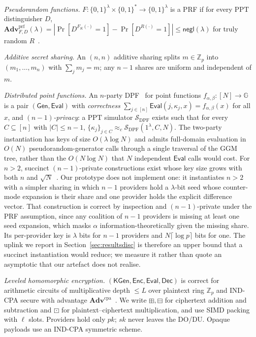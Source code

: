 \documentclass[journal]{IEEEtran}
\newcommand{\negl}{\mathsf{negl}}
\newcommand{\PPT}{\mathrm{PPT}}
\newcommand{\Sim}{\mathcal{S}}
\newcommand{\cind}{\approx_c}
\newcommand{\Gen}{\mathsf{Gen}}
\newcommand{\Eval}{\mathsf{Eval}}
\newcommand{\Dec}{\mathsf{Dec}}
\newcommand{\Enc}{\mathsf{Enc}}
\newcommand{\advPRF}{\mathbf{Adv}^{\mathrm{prf}}}
\newcommand{\advCPA}{\mathbf{Adv}^{\mathrm{cpa}}}
\newcommand{\bplus}{\boxplus}
\newcommand{\bminus}{\boxminus}
\newcommand{\bdot}{\boxdot}
\begin{document}
\emph{Pseudorandom functions.} $F:\{0,1\}^\lambda\times\{0,1\}^*\!\to\!\{0,1\}^\lambda$ is a PRF if for every $\PPT$ distinguisher $D$, $\advPRF_{F,D}(\lambda)=|\Pr[D^{F_K(\cdot)}=1]-\Pr[D^{R(\cdot)}=1]|\le\negl(\lambda)$ for truly random $R$~\cite{goldreich2019construct}.

\emph{Additive secret sharing.} An $(n,n)$ additive sharing splits $m\in\mathbb{Z}_p$ into $(m_1,\dots,m_n)$ with $\sum_j m_j=m$; any $n-1$ shares are uniform and independent of $m$.

\emph{Distributed point functions.} An $n$-party DPF~\cite{gilboa2014distributed,boyle2015function,boyle2016function} for point functions $f_{\alpha,\beta}:[N]\!\to\!\mathbb{G}$ is a pair $(\Gen,\Eval)$ with \emph{correctness} $\sum_{j\in[n]}\Eval(j,\kappa_j,x)=f_{\alpha,\beta}(x)$ for all $x$, and \emph{$(n{-}1)$-privacy}: a $\PPT$ simulator $\Sim_{\mathrm{DPF}}$ exists such that for every $C\subseteq[n]$ with $|C|\le n{-}1$, $\{\kappa_j\}_{j\in C}\cind\Sim_{\mathrm{DPF}}(1^\lambda,C,N)$. The two-party instantiation has keys of size $O(\lambda\log N)$ and admits full-domain evaluation in $O(N)$ pseudorandom-generator calls through a single traversal of the GGM tree, rather than the $O(N\log N)$ that $N$ independent $\Eval$ calls would cost. For $n>2$, succinct $(n{-}1)$-private constructions exist whose key size grows with both $n$ and $\sqrt{N}$~\cite{boyle2015function}. Our prototype does not implement one: it instantiates $n>2$ with a simpler sharing in which $n-1$ providers hold a $\lambda$-bit seed whose counter-mode expansion is their share and one provider holds the explicit difference vector. That construction is correct by inspection and $(n{-}1)$-private under the PRF assumption, since any coalition of $n-1$ providers is missing at least one seed expansion, which masks $\alpha$ information-theoretically given the missing share. Its per-provider key is $\lambda$ bits for $n-1$ providers and $N\lceil\log p\rceil$ bits for one. The uplink we report in Section~\ref{sec:resultsdisc} is therefore an upper bound that a succinct instantiation would reduce; we measure it rather than quote an asymptotic that our artefact does not realise.

\emph{Leveled homomorphic encryption.} $(\mathsf{KGen},\Enc,\Eval,\Dec)$ is correct for arithmetic circuits of multiplicative depth $\le L$ over plaintext ring $\mathbb{Z}_p$ and IND-CPA secure with advantage $\advCPA$~\cite{fan2012somewhat,cryptoeprint:2016/421}. We write $\bplus,\bminus$ for ciphertext addition and subtraction and $\bdot$ for plaintext--ciphertext multiplication, and use SIMD packing with $\ell$ slots. Providers hold only $pk$; $sk$ never leaves the DO/DU. Opaque payloads use an IND-CPA symmetric scheme.
\end{document}
